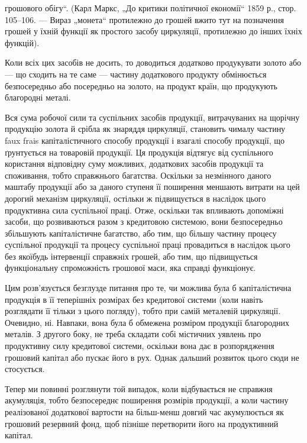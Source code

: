 \parcont{}  %
грошового обігу“. (Карл Маркс, „До критики політичної економії“
1859 р., стор. 105--106. — Вираз „монета“ протилежно до грошей вжито
тут на позначення грошей у їхній функції як простого засобу циркуляції,
протилежно до інших їхніх функцій).

Коли всіх цих засобів не досить, то доводиться додатково продукувати
золото або — що сходить на те саме — частину додаткового продукту
обмінюється безпосередньо або посередньо на золото, на продукт країн,
що продукують благородні металі.

Вся сума робочої сили та суспільних засобів продукції, витрачуваних
на щорічну продукцію золота й срібла як знаряддя циркуляції, становить
чималу частину faux frais капіталістичного способу продукції і взагалі
способу продукції, що ґрунтується на товаровій продукції. Ця продукція
відтягує від суспільного користання відповідну суму можливих,
додаткових засобів продукції та споживання, тобто справжнього багатства.
Оскільки за незмінного даного маштабу продукції або за даного ступеня
її поширення меншають витрати на цей дорогий механізм циркуляції,
остільки ж підвищується в наслідок цього продуктивна сила суспільної
праці. Отже, оскільки так впливають допоміжні засоби, що розвиваються
разом з кредитовою системою, вони безпосередньо збільшують капіталістичне
багатство, або тим, що більшу частину процесу суспільної продукції
та процесу суспільної праці провадиться в наслідок цього без
якоїбудь інтервенції справжніх грошей, або тим, що підвищується
функціональну спроможність грошової маси, яка справді функціонує.

Цим розв’язується безглузде питання про те, чи можлива була б
капіталістична продукція в її теперішніх розмірах без кредитової системи
(коли навіть розглядати її тільки з цього погляду), тобто при самій
металевій циркуляції. Очевидно, ні. Навпаки, вона була б обмежена розміром
продукції благородних металів. З другого боку, не треба складати собі
містичних уявлень про продуктивну силу кредитової системи, оскільки
вона дає в розпорядження грошовий капітал або пускає його в рух.
Однак дальший розвиток цього сюди не стосується.

Тепер ми повинні розглянути той випадок, коли відбувається не
справжня акумуляція, тобто безпосереднє поширення розмірів продукції,
а коли частину реалізованої додаткової вартости на більш-менш довгий
час акумулюється як грошовий резервний фонд, щоб пізніше перетворити
його на продуктивний капітал.


